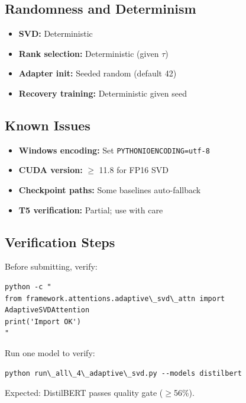 \subsection{Randomness and Determinism}

\begin{itemize}
\item \textbf{SVD:} Deterministic
\item \textbf{Rank selection:} Deterministic (given $\tau$)
\item \textbf{Adapter init:} Seeded random (default 42)
\item \textbf{Recovery training:} Deterministic given seed

\end{itemize}
\subsection{Known Issues}

\begin{itemize}
\item \textbf{Windows encoding:} Set \texttt{PYTHONIOENCODING=utf-8}
\item \textbf{CUDA version:} $\ge$ 11.8 for FP16 SVD
\item \textbf{Checkpoint paths:} Some baselines auto-fallback
\item \textbf{T5 verification:} Partial; use with care

\end{itemize}
\subsection{Verification Steps}

Before submitting, verify:

\begin{lstlisting}
python -c "
from framework.attentions.adaptive\_svd\_attn import AdaptiveSVDAttention
print('Import OK')
"
\end{lstlisting}

Run one model to verify:

\begin{lstlisting}
python run\_all\_4\_adaptive\_svd.py --models distilbert
\end{lstlisting}

Expected: DistilBERT passes quality gate ($\ge$56\%).